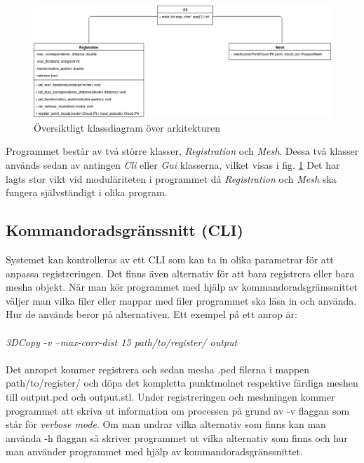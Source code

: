 \begin{figure}[H]
	\centering
	\includegraphics[width=130mm]{figures/klassdiagram.png}
	\caption{Översiktligt klassdiagram över arkitekturen}
	\label{fig:class_diagram}
\end{figure}

Programmet består av två större klasser, \textit{Registration} och \textit{Mesh}. Dessa två klasser används sedan av antingen \textit{Cli}  eller \textit{Gui} klasserna, vilket visas i fig. \ref{fig:class_diagram}  Det har lagts stor vikt vid moduläriteten i programmet då \textit{Registration} och \textit{Mesh} ska fungera självständigt i olika program.

\subsection{Kommandoradsgränssnitt (CLI)}

Systemet kan kontrolleras av ett CLI som kan ta in olika parametrar för att anpassa registreringen. Det finns även alternativ för att bara registrera eller bara mesha objekt. När man kör programmet med hjälp av kommandoradsgränssnittet väljer man vilka filer eller mappar med filer programmet ska läsa in och använda. Hur de används beror på alternativen. Ett exempel på ett anrop är:\\\\
\textit{3DCopy -v --max-corr-dist 15 path/to/register/ output}\\\\
Det anropet kommer registrera och sedan mesha .pcd filerna i mappen path/to/register/ och döpa det kompletta punktmolnet respektive färdiga meshen till output.pcd och output.stl. Under registreringen och meshningen kommer programmet att skriva ut information om processen på grund av -v flaggan som står för \textit{verbose mode}. Om man undrar vilka alternativ som finns kan man använda -h flaggan så skriver programmet ut vilka alternativ som finns och hur man använder programmet med hjälp av kommandoradsgränssnittet. 


